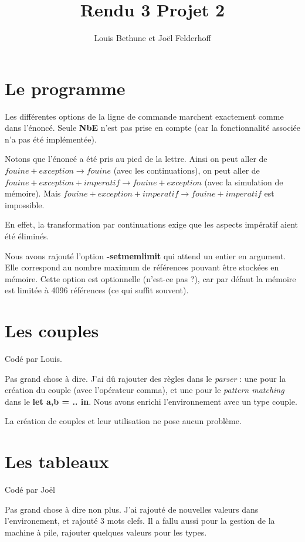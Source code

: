 \documentclass[a4paper,10pt]{report}
\title{Rendu 3 Projet 2}
\author{Louis Bethune et Jo\"el Felderhoff}
\date{}
\begin{document}
\maketitle

\section{Le programme}

Les différentes options de la ligne de commande marchent exactement comme dans l'énoncé. Seule \textbf{NbE} n'est pas prise en compte (car la fonctionnalité associée n'a pas été implémentée).

Notons que l'énoncé a été pris au pied de la lettre. Ainsi on peut aller de $fouine + exception \rightarrow fouine$ (avec les continuations), on peut aller de $fouine + exception + imperatif \rightarrow fouine + exception$ (avec la simulation de mémoire). Mais $fouine + exception + imperatif \rightarrow fouine + imperatif$ est impossible.  
  
En effet, la transformation par continuations exige que les aspects impératif aient été éliminés.  
  
Nous avons rajouté l'option \textbf{-setmemlimit} qui attend un entier en argument. Elle correspond au nombre maximum de références pouvant être stockées en mémoire. Cette option est optionnelle (n'est-ce pas ?), car par défaut la mémoire est limitée à 4096 références (ce qui suffit souvent).   
  
\section{Les couples}

Codé par Louis.  
  
Pas grand chose à dire. J'ai dû rajouter des règles dans le \textit{parser} : une pour la création du couple (avec l'opérateur comma), et une pour le \textit{pattern matching} dans le \textbf{let a,b  = .. in}. Nous avons enrichi l'environnement avec un type couple.  
  
La création de couples et leur utilisation ne pose aucun problème.  
  
\section{Les tableaux}

Codé par Joël

Pas grand chose à dire non plus. J'ai rajouté de nouvelles valeurs dans l'environement, et rajouté 3 mots clefs. Il a fallu aussi pour la gestion de la machine à pile, rajouter quelques valeurs pour les types.
\end{document}
